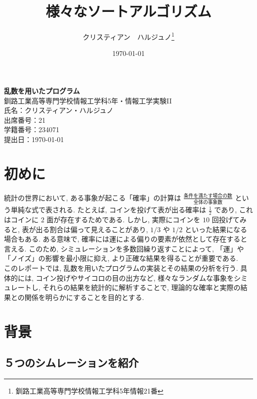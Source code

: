 \documentclass[a4j, 12pt ]{jarticle}
\title{様々なソートアルゴリズム}
\author{クリスティアン　ハルジュノ\thanks{釧路工業高等専門学校情報工学科5年情報21番}}
\date{\today}
\begin{document}
\begin{titlepage}
  \centering
  \vspace*{3cm}

  {\fontsize{25pt}{36pt}\selectfont\bfseries 乱数を用いたプログラム} \\[1cm]  %
  {\Large 釧路工業高等専門学校情報工学科5年・情報工学実験II} \\[1cm]
  {\large 氏名：クリスティアン・ハルジュノ} \\[1cm]
  {\large 出席番号：21} \\[1cm]
  {\large 学籍番号：234071} \\[5cm]


  {\Large 提出日：\today} \\
  \vfill

\end{titlepage}
\tableofcontents
\newpage
\setcounter{page}{1}
\section{初めに}
統計の世界において, ある事象が起こる「確率」の計算は $\frac{\text{条件を満たす場合の数}}{\text{全体の事象数}}$ という単純な式で表される. たとえば, コインを投げて表が出る確率は $\frac{1}{2}$ であり, これはコインに $2$ 面が存在するためである. しかし, 実際にコインを $10$ 回投げてみると, 表が出る割合は偏って見えることがあり, $1/3$ や $1/2$ といった結果になる場合もある. ある意味で, 確率には運による偏りの要素が依然として存在すると言える. このため, シミュレーションを多数回繰り返すことによって, 「運」や「ノイズ」の影響を最小限に抑え, より正確な結果を得ることが重要である.\\

このレポートでは, 乱数を用いたプログラムの実装とその結果の分析を行う. 具体的には, コイン投げやサイコロの目の出方など, 様々なランダムな事象をシミュレートし, それらの結果を統計的に解析することで, 理論的な確率と実際の結果との関係を明らかにすることを目的とする.\\
\section{背景}
\subsection{５つのシムレーションを紹介}
\end{document}
